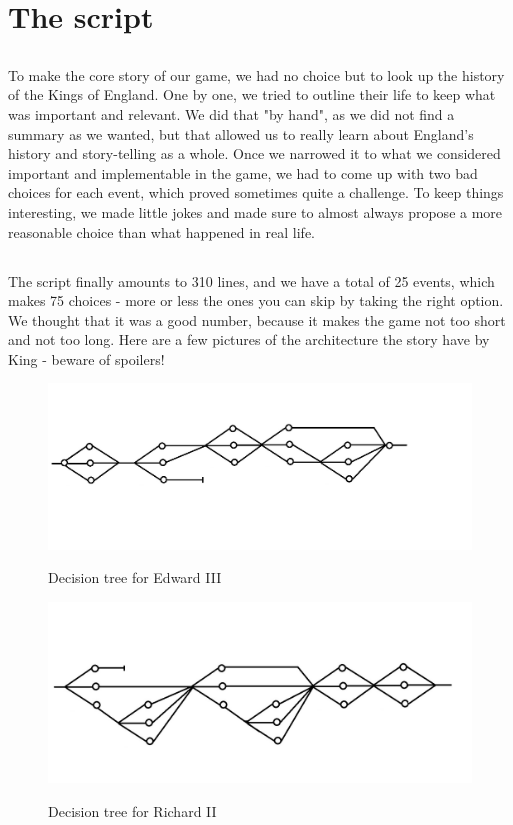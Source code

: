 \documentclass{scrreprt}
\begin{document}
\section{The script}

\subsection*{} To make the core story of our game, we had no choice but to look up the history of the Kings of England. One by one, we tried to outline their life to keep what was important and relevant. We did that "by hand", as we did not find a summary as we wanted, but that allowed us to really learn about England's history and story-telling as a whole. Once we narrowed it to what we considered important and implementable in the game, we had to come up with two bad choices for each event, which proved sometimes quite a challenge. To keep things interesting, we made little jokes and made sure to almost always propose a more reasonable choice than what happened in real life.
\subsection*{} The script finally amounts to 310 lines, and we have a total of 25 events, which makes 75 choices - more or less the ones you can skip by taking the right option. We thought that it was a good number, because it makes the game not too short and not too long. Here are a few pictures of the architecture the story have by King - beware of spoilers!

\begin{figure}
	\includegraphics[scale=0.7]{Edward3.jpg}
	\begin{center}
		Decision tree for Edward III 
	\end{center}
\end{figure}

\begin{figure}
	\includegraphics[scale=0.7]{Richard2.jpg}
	\begin{center}
		Decision tree for Richard II 
	\end{center}
\end{figure}
\end{document}
